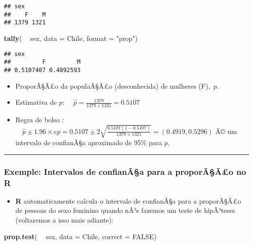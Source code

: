 \documentclass[]{article}
\newenvironment{Shaded}{\begin{snugshade}}{\end{snugshade}}
\newcommand{\KeywordTok}[1]{\textcolor[rgb]{0.13,0.29,0.53}{\textbf{#1}}}
\newcommand{\DataTypeTok}[1]{\textcolor[rgb]{0.13,0.29,0.53}{#1}}
\newcommand{\StringTok}[1]{\textcolor[rgb]{0.31,0.60,0.02}{#1}}
\newcommand{\OtherTok}[1]{\textcolor[rgb]{0.56,0.35,0.01}{#1}}
\newcommand{\OperatorTok}[1]{\textcolor[rgb]{0.81,0.36,0.00}{\textbf{#1}}}
\newcommand{\NormalTok}[1]{#1}
\providecommand{\tightlist}{%
  \setlength{\itemsep}{0pt}\setlength{\parskip}{0pt}}
\begin{document}
\begin{verbatim}
## sex
##    F    M 
## 1379 1321
\end{verbatim}

\begin{Shaded}
\begin{Highlighting}[]
\KeywordTok{tally}\NormalTok{( }\OperatorTok{~}\StringTok{ }\NormalTok{sex, }\DataTypeTok{data =}\NormalTok{ Chile, }\DataTypeTok{format =} \StringTok{"prop"}\NormalTok{)}
\end{Highlighting}
\end{Shaded}

\begin{verbatim}
## sex
##         F         M 
## 0.5107407 0.4892593
\end{verbatim}

\begin{itemize}
\tightlist
\item
  ProporÃ§Ã£o da populaÃ§Ã£o (desconhecida) de mulheres (F),~\(p\).
\item
  Estimativa de \(p\):
  \(\quad \hat{p} = \frac{1379}{1379+1321} = 0.5107\)
\item
  Regra de bolso :
  \(\quad \hat{p} \pm 1.96 \times ep = 0.5107 \pm 2 \sqrt{\frac{0.5107(1-0.5107)}{1379 + 1321}} = (0.4919, 0.5296)\)
  Ã© um intervalo de confianÃ§a aproximado de 95\% para \(p\).
\end{itemize}

\begin{center}\rule{0.5\linewidth}{\linethickness}\end{center}

\subsubsection{\texorpdfstring{Exemple: Intervalos de confianÃ§a para a
proporÃ§Ã£o no
\textbf{R}}{Exemple: Intervalos de confianÃ§a para a proporÃ§Ã£o no R}}\label{exemple-intervalos-de-confianaa-para-a-proporaao-no-r}

\begin{itemize}
\tightlist
\item
  \textbf{R} automaticamente calcula o intervalo de confianÃ§a para a
  proporÃ§Ã£o de pessoas do sexo feminino quando nÃ³s fazemos um teste
  de hipÃ³teses (voltaremos a isso mais adiante):
\end{itemize}

\begin{Shaded}
\begin{Highlighting}[]
\KeywordTok{prop.test}\NormalTok{( }\OperatorTok{~}\StringTok{ }\NormalTok{sex, }\DataTypeTok{data =}\NormalTok{ Chile, }\DataTypeTok{correct =} \OtherTok{FALSE}\NormalTok{)}
\end{Highlighting}
\end{Shaded}
\end{document}
